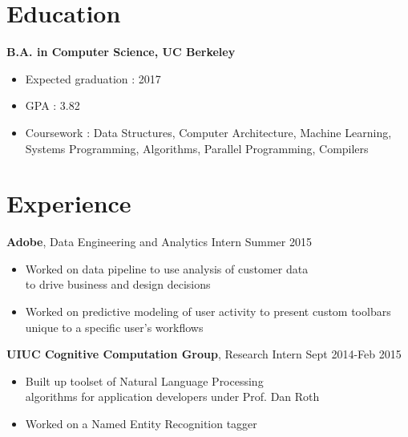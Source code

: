 \documentclass[margin]{res}
\begin{document}
 


\begin{resume} 
  

  \section{Education} 
          {\bf B.A. in Computer Science, UC Berkeley}
          \begin{itemize} \itemsep -3pt
          \item Expected graduation : 2017
	  \item GPA : 3.82
          \item Coursework : Data Structures, Computer Architecture,
              Machine Learning, \\Systems Programming, Algorithms, Parallel
              Programming, Compilers
          \end{itemize}
          

          \section{Experience}
                  {\bf Adobe}, Data Engineering and Analytics Intern \hfill Summer 2015
                  \begin{itemize} \itemsep -3pt
                  \item Worked on data pipeline to use analysis of customer data \\to drive business and design decisions
                  \item Worked on predictive modeling of user activity to present custom toolbars unique to a specific user's workflows
                  \end{itemize}
                  
                  {\bf UIUC Cognitive Computation Group}, Research Intern \hfill Sept 2014-Feb 2015
                  \begin{itemize} \itemsep -3pt
                  \item Built up toolset of Natural Language Processing \\
                    algorithms for application developers under Prof. Dan Roth
                  \item Worked on a Named Entity Recognition tagger
                  \end{itemize}
                  

\end{resume}
\end{document}
